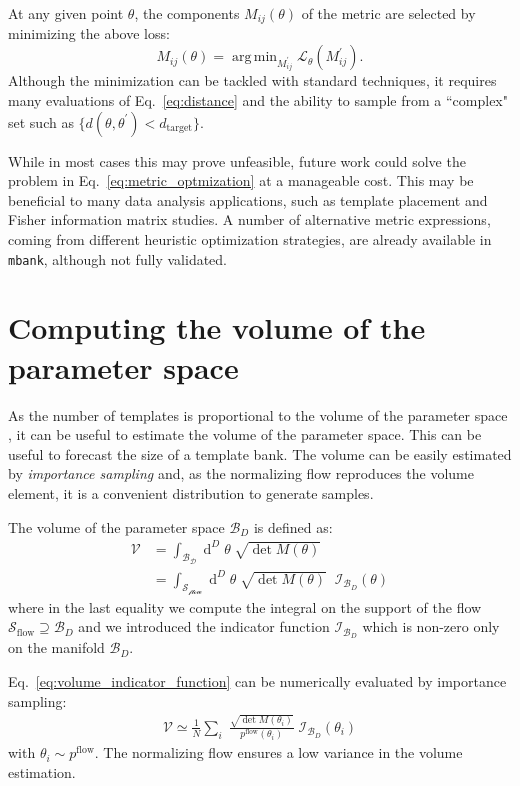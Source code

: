 \documentclass[twocolumn,showpacs,preprintnumbers,nofootinbib,prd,
superscriptaddress,10pt]{revtex4-2}
\newcommand{\dvol}[2]{\ensuremath{\operatorname{d}^{#2}\!{#1}}}
\DeclareMathOperator*{\argmin}{arg\,min}
\begin{document}
At any given point $\theta$, the components $M_{ij}(\theta)$ of the metric are selected by minimizing the above loss:
\begin{equation} \label{eq:metric_optmization}
	M_{ij}(\theta) = \argmin_{M^\prime_{ij}}  \mathcal{L}_\theta(M^\prime_{ij}).
\end{equation}
Although the minimization can be tackled with standard techniques, it requires many evaluations of Eq.~\eqref{eq:distance} and the ability to sample from a ``complex" set such as ${\{d(\theta,\theta^\prime) < d_\mathrm{target}\}}$.

While in most cases this may prove unfeasible, future work could solve the problem in Eq.~\eqref{eq:metric_optmization} at a manageable cost. This may be beneficial to many data analysis applications, such as template placement and Fisher information matrix studies.
A number of alternative metric expressions, coming from different heuristic optimization strategies, are already available in \texttt{mbank}, although not fully validated.

\section{Computing the volume of the parameter space}\label{app:parameter_space_volume}

As the number of templates is proportional to the volume of the parameter space \cite{owen_metric}, it can be useful to estimate the volume of the parameter space. This can be useful to forecast the size of a template bank.
The volume can be easily estimated by {\it importance sampling} and, as the normalizing flow reproduces the volume element, it is a convenient distribution to generate samples.

The volume of the parameter space $\mathcal{B}_D$ is defined as:
\begin{align}
	\mathcal{V} & = \int_\mathcal{\mathcal{B}_D} \dvol{\theta}{D} \; \sqrt{\det M(\theta)} \\
				& = \int_\mathcal{\mathcal{S}_\text{flow}} \dvol{\theta}{D} \; \sqrt{\det M(\theta)} \;\; \mathcal{I}_{\mathcal{B}_D}(\theta) \label{eq:volume_indicator_function}
\end{align}
where in the last equality we compute the integral on the support of the flow $\mathcal{S}_\text{flow} \supseteq \mathcal{B}_D$ and we introduced the indicator function $\mathcal{I}_{\mathcal{B}_D}$ which is non-zero only on the manifold $\mathcal{B}_D$.

Eq.~\eqref{eq:volume_indicator_function} can be numerically evaluated by importance sampling:
%
\begin{align}\label{eq:vol_IS}
	\mathcal{V} \simeq \frac{1}{N} \sum_i \; \frac{\sqrt{\det M(\theta_i)}}{p^\text{flow}(\theta_i)} \; \mathcal{I}_{\mathcal{B}_D}(\theta_i)
\end{align}
with  $\theta_i \sim p^\text{flow}$.
The normalizing flow ensures a low variance in the volume estimation.
\end{document}
